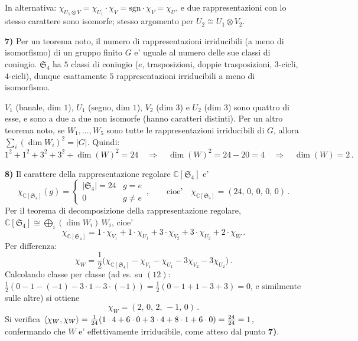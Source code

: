 \documentclass{report}
\begin{document}
{  In alternativa: $ \chi_{U_1 \otimes V} = \chi_{U_1} \cdot \chi_V = \mathrm{sgn} \cdot \chi_V = \chi_U $, e due rappresentazioni con lo stesso carattere sono isomorfe; stesso argomento per $ U_2 \cong U_1 \otimes V_2 $.

  \textbf{7)} Per un teorema noto, il numero di rappresentazioni irriducibili (a meno di isomorfismo) di un gruppo finito $ G $ e' uguale al numero delle sue classi di coniugio. $ \mathfrak{S}_4 $ ha $ 5 $ classi di coniugio ($ e $, trasposizioni, doppie trasposizioni, $ 3 $-cicli, $ 4 $-cicli), dunque esattamente $ 5 $ rappresentazioni irriducibili a meno di isomorfismo.

  $ V_1 $ (banale, dim $ 1 $), $ U_1 $ (segno, dim $ 1 $), $ V_2 $ (dim $ 3 $) e $ U_2 $ (dim $ 3 $) sono quattro di esse, e sono a due a due non isomorfe (hanno caratteri distinti). Per un altro teorema noto, se $ W_1,\ldots,W_5 $ sono tutte le rappresentazioni irriducibili di $ G $, allora $ \sum_i (\dim W_i)^2 = |G| $. Quindi:
  \[
    1^2 + 1^2 + 3^2 + 3^2 + \dim(W)^2 = 24 \quad \Longrightarrow \quad \dim(W)^2 = 24 - 20 = 4 \quad \Longrightarrow \quad \dim(W) = 2\,.
  \]

  \textbf{8)} Il carattere della rappresentazione regolare $ \mathbb{C}[\mathfrak{S}_4] $ e'
  \[
    \chi_{\mathbb{C}[\mathfrak{S}_4]}(g) = \begin{cases} |\mathfrak{S}_4| = 24 & g = e \\ 0 & g \neq e \end{cases}\,, \qquad \text{cioe'} \quad \chi_{\mathbb{C}[\mathfrak{S}_4]} = (24,\, 0,\, 0,\, 0,\, 0)\,.
  \]
  Per il teorema di decomposizione della rappresentazione regolare, $ \mathbb{C}[\mathfrak{S}_4] \cong \bigoplus_i (\dim W_i)\, W_i $, cioe'
  \[
    \chi_{\mathbb{C}[\mathfrak{S}_4]} = 1 \cdot \chi_{V_1} + 1 \cdot \chi_{U_1} + 3 \cdot \chi_{V_2} + 3 \cdot \chi_{U_2} + 2 \cdot \chi_W\,.
  \]
  Per differenza:
  \[
    \chi_W = \frac{1}{2}\Big( \chi_{\mathbb{C}[\mathfrak{S}_4]} - \chi_{V_1} - \chi_{U_1} - 3\chi_{V_2} - 3\chi_{U_2} \Big)\,.
  \]
  Calcolando classe per classe (ad es. su $ (12) $: $ \frac{1}{2}(0 - 1 - (-1) - 3\cdot 1 - 3\cdot(-1)) = \frac{1}{2}(0-1+1-3+3) = 0 $, e similmente sulle altre) si ottiene
  \[
    \chi_W = (2,\, 0,\, 2,\, -1,\, 0)\,.
  \]
  Si verifica $ \langle \chi_W, \chi_W \rangle = \frac{1}{24}(1 \cdot 4 + 6 \cdot 0 + 3 \cdot 4 + 8 \cdot 1 + 6 \cdot 0) = \frac{24}{24} = 1 $, confermando che $ W $ e' effettivamente irriducibile, come atteso dal punto \textbf{7)}. \Qed
}
\end{document}
